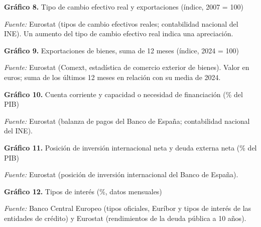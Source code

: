 \documentclass[11pt,a4paper]{article}
\newlength{\altograf}\setlength{\altograf}{5.6cm}
\newenvironment{bloquecuadro}{\par\noindent\begingroup\scriptsize\setlength{\tabcolsep}{1.6pt}\renewcommand{\arraystretch}{1.08}}{\endgroup\par}
\newcommand{\grafico}[4]{%
  \begin{minipage}[t]{0.495\linewidth}\centering
    {\small\textbf{Gráfico #1.} #2\par}\vspace{1pt}
    \par\vspace{-2pt}
    \begin{minipage}{0.95\linewidth}\raggedright\tiny\textit{Fuente:} #3\end{minipage}
  \end{minipage}}
\begin{document}
\begin{bloquecuadro}\end{bloquecuadro}
\vspace{6pt}
\begin{bloquecuadro}\end{bloquecuadro}
\vspace{4pt}\noindent\setlength{\altograf}{4.4cm}
\grafico{8}{Tipo de cambio efectivo real y exportaciones (índice, 2007 = 100)}{Eurostat (tipos de cambio efectivos reales; contabilidad nacional del INE). Un aumento del tipo de cambio efectivo real indica una apreciación.}{g08-competitividad}\hfill
\grafico{9}{Exportaciones de bienes, suma de 12 meses (índice, 2024 = 100)}{Eurostat (Comext, estadística de comercio exterior de bienes). Valor en euros; suma de los últimos 12 meses en relación con su media de 2024.}{g09-exportaciones-eeuu}
\clearpage

\begin{bloquecuadro}\end{bloquecuadro}
\vspace{6pt}\noindent\setlength{\altograf}{5.8cm}
\grafico{10}{Cuenta corriente y capacidad o necesidad de financiación (\% del PIB)}{Eurostat (balanza de pagos del Banco de España; contabilidad nacional del INE).}{g10-cuenta-corriente}\hfill
\grafico{11}{Posición de inversión internacional neta y deuda externa neta (\% del PIB)}{Eurostat (posición de inversión internacional del Banco de España).}{g11-piin}
\clearpage

\begin{bloquecuadro}\end{bloquecuadro}
\vspace{8pt}\noindent\setlength{\altograf}{5.8cm}
\grafico{12}{Tipos de interés (\%, datos mensuales)}{Banco Central Europeo (tipos oficiales, Euríbor y tipos de interés de las entidades de crédito) y Eurostat (rendimientos de la deuda pública a 10 años).}{g12-tipos}\hfill
\begin{minipage}[t]{0.47\linewidth}\vspace{0pt}\end{minipage}
\clearpage
\end{document}

